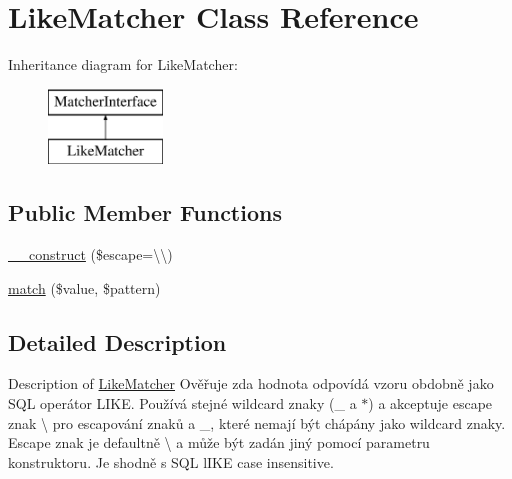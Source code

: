 \hypertarget{class_pes_1_1_query_1_1_matcher_1_1_like_matcher}{}\section{Like\+Matcher Class Reference}
\label{class_pes_1_1_query_1_1_matcher_1_1_like_matcher}
Inheritance diagram for Like\+Matcher\+:\begin{figure}[H]
\begin{center}
\leavevmode
\includegraphics[height=2.000000cm]{class_pes_1_1_query_1_1_matcher_1_1_like_matcher}
\end{center}
\end{figure}
\subsection*{Public Member Functions}
\begin{DoxyCompactItemize}
\item 
\mbox{\hyperlink{class_pes_1_1_query_1_1_matcher_1_1_like_matcher_a11119d8e9d3e88844b5dd2ed47657758}{\+\_\+\+\_\+construct}} (\$escape=\textquotesingle{}\textbackslash{}\textbackslash{}\textquotesingle{})
\item 
\mbox{\hyperlink{class_pes_1_1_query_1_1_matcher_1_1_like_matcher_af38750109828e091458dbb0481a2a0d7}{match}} (\$value, \$pattern)
\end{DoxyCompactItemize}


\subsection{Detailed Description}
Description of \mbox{\hyperlink{class_pes_1_1_query_1_1_matcher_1_1_like_matcher}{Like\+Matcher}} Ověřuje zda hodnota odpovídá vzoru obdobně jako S\+QL operátor L\+I\+KE. Používá stejné wildcard znaky (\textquotesingle{}\+\_\+\textquotesingle{} a \textquotesingle{}$\ast$\textquotesingle{}) a akceptuje escape znak \textquotesingle{}\textbackslash{}\textquotesingle{} pro escapování znaků \textquotesingle{}\textquotesingle{} a \textquotesingle{}\+\_\+\textquotesingle{}, které nemají být chápány jako wildcard znaky. Escape znak je defaultně \textquotesingle{}\textbackslash{}\textquotesingle{} a může být zadán jiný pomocí parametru konstruktoru. Je shodně s S\+QL l\+I\+KE case insensitive.


